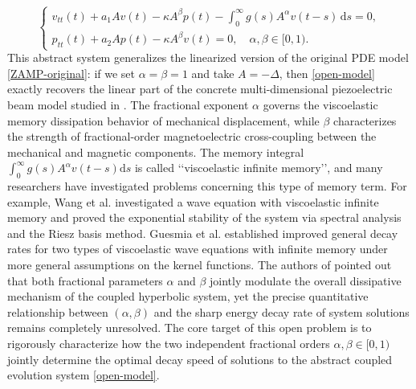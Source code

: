\documentclass[12pt,reqno]{article}
\begin{document}
\begin{equation}\label{open-model}
\begin{cases}
v_{tt}(t) + a_1 A v(t) - \kappa A^\beta p(t) - \displaystyle\int_{0}^{\infty} g(s) A^\alpha v(t-s)\,\mathrm{d}s = 0,\\
p_{tt}(t) + a_2 A p(t) - \kappa A^\beta v(t) = 0,\quad \alpha,\beta\in[0,1).
\end{cases}
\end{equation} This abstract system generalizes the linearized version of the original PDE model \eqref{ZAMP-original}: if we set $\alpha=\beta=1$ and take $A=-\Delta$, then \eqref{open-model} exactly recovers the linear part of the concrete multi-dimensional piezoelectric beam model studied in \cite{MR4450079}. The fractional exponent $\alpha$ governs the viscoelastic memory dissipation behavior of mechanical displacement, while $\beta$ characterizes the strength of fractional-order magnetoelectric cross-coupling between the mechanical and magnetic components. The memory integral $\int_0^\infty g(s) A^\alpha v(t-s)\mathrm{d}s$ is called \lq\lq viscoelastic infinite memory\rq\rq, and many researchers have investigated problems concerning this type of memory term. For example, Wang et al. \cite{MR3109859} investigated a wave equation with viscoelastic infinite memory and proved the exponential stability of the system via spectral analysis and the Riesz basis method. Guesmia et al. \cite{MR4125294} established improved general decay rates for two types of viscoelastic wave equations with infinite memory under more general assumptions on the kernel functions.
The authors of \cite{MR4450079} pointed out that both fractional parameters $\alpha$ and $\beta$ jointly modulate the overall dissipative mechanism of the coupled hyperbolic system, yet the precise quantitative relationship between $(\alpha,\beta)$ and the sharp energy decay rate of system solutions remains completely unresolved. The core target of this open problem is to rigorously characterize how the two independent fractional orders $\alpha,\beta\in[0,1)$ jointly determine the optimal decay speed of solutions to the abstract coupled evolution system \eqref{open-model}.
\end{document}
